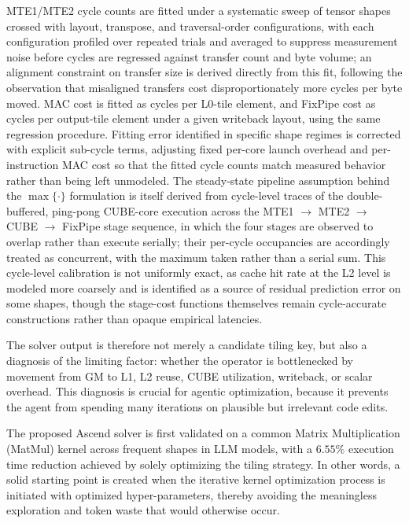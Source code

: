 MTE1/MTE2 cycle counts are fitted under a systematic sweep of tensor shapes crossed with layout, transpose, and traversal-order configurations, with each configuration profiled over repeated trials and averaged to suppress measurement noise before cycles are regressed against transfer count and byte volume; an alignment constraint on transfer size is derived directly from this fit, following the observation that misaligned transfers cost disproportionately more cycles per byte moved. MAC cost is fitted as cycles per L0-tile element, and FixPipe cost as cycles per output-tile element under a given writeback layout, using the same regression procedure. Fitting error identified in specific shape regimes is corrected with explicit sub-cycle terms, adjusting fixed per-core launch overhead and per-instruction MAC cost so that the fitted cycle counts match measured behavior rather than being left unmodeled. The steady-state pipeline assumption behind the $\max\{\cdot\}$ formulation is itself derived from cycle-level traces of the double-buffered, ping-pong CUBE-core execution across the MTE1 $\to$ MTE2 $\to$ CUBE $\to$ FixPipe stage sequence, in which the four stages are observed to overlap rather than execute serially; their per-cycle occupancies are accordingly treated as concurrent, with the maximum taken rather than a serial sum. This cycle-level calibration is not uniformly exact, as cache hit rate at the L2 level is modeled more coarsely and is identified as a source of residual prediction error on some shapes, though the stage-cost functions themselves remain cycle-accurate constructions rather than opaque empirical latencies.

The solver output is therefore not merely a candidate tiling key, but also a diagnosis of the limiting factor: whether the operator is bottlenecked by movement from GM to L1, L2 reuse, CUBE utilization, writeback, or scalar overhead. This diagnosis is crucial for agentic optimization, because it prevents the agent from spending many iterations on plausible but irrelevant code edits.

The proposed Ascend solver is first validated on a common Matrix Multiplication (MatMul) kernel across frequent shapes in LLM models, with a $\mathbf{6.55\%}$ execution time reduction achieved by solely optimizing the tiling strategy. In other words, a solid starting point is created when the iterative kernel optimization process is initiated with optimized hyper-parameters, thereby avoiding the meaningless exploration and token waste that would otherwise occur.  

